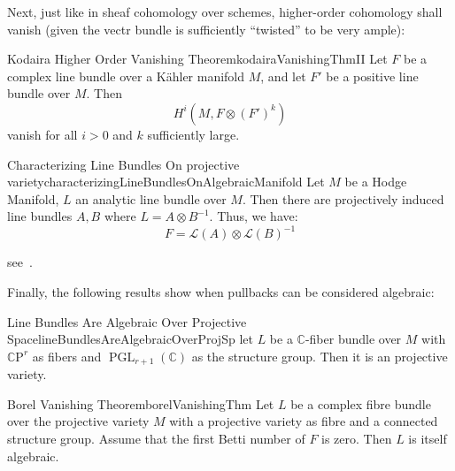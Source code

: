 \documentclass{ut-thesis}
\newenvironment{Proof}[1][]
  {\begin{ProofTcb}[#1]}
  {\end{ProofTcb}}
\newcommand{\C}{{\mathbb{C}}}
\newcommand{\CL}{{\mathcal{L}}}
\newcommand{\CP}{{\mathbb{C}\mathrm{P}}}
\newcommand{\GL}{{\operatorname{GL}}}
\newcommand{\PGL}{{\operatorname{PGL}}}
\begin{document}
Next, just like in sheaf cohomology over schemes, higher-order cohomology shall vanish (given the vectr bundle
is sufficiently ``twisted'' to be very ample):

\begin{thm}{Kodaira Higher Order Vanishing Theorem}{kodairaVanishingThmII}
  Let $F$ be a complex line bundle over a K\"ahler manifold $M$, and let $F'$ be a positive line bundle over $M$.
  Then
  \[
    H^i(M, F\otimes (F')^k)
  \]
  vanish for all $i > 0$ and $k$ sufficiently large.
\end{thm}

\begin{Proof}
  \cite{voisinHodgeTheoryComplex2002}
\end{Proof}

\begin{thm}{Characterizing Line Bundles On projective variety}{characterizingLineBundlesOnAlgebraicManifold}
  Let $M$ be a Hodge Manifold, $L$ an analytic line bundle over $M$. Then there are projectively induced
  line bundles $A,B$ where $L = A\otimes B^{-1}$. Thus, we have:
  \[
    F = \CL(A)\otimes \CL(B)^{-1}
  \]
\end{thm}

\begin{Proof}
  see~\cite[p.141, thm~18.2.5]{hirzebruchTopologicalMethodsAlgebraic1995}.
\end{Proof}

Finally, the following results show when pullbacks can be considered algebraic:

\begin{thm}{Line Bundles Are Algebraic Over Projective Space}{lineBundlesAreAlgebraicOverProjSp}
  let $L$ be a $\C$-fiber bundle over $M$ with $\CP^r$ as fibers and $\PGL_{r+1}(\C)$ as the structure group.
  Then it is an projective variety.
\end{thm}

\begin{Proof}
\cite{deligneRelevementsModulop2etDecomposition1987}
\end{Proof}




\begin{thm}{Borel Vanishing Theorem}{borelVanishingThm}
  Let $L$ be a complex fibre bundle over the projective variety $M$ with a projective variety as fibre
  and a connected structure group. Assume that the first Betti number of $F$ is zero. Then $L$ is itself
  algebraic.
\end{thm}
\end{document}
